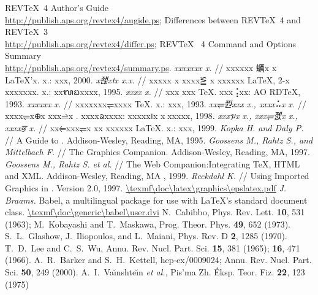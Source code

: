 \documentclass[
aps,%
12pt,%
final,%
notitlepage,%
oneside,%
onecolumn,%
nobibnotes,%
nofootinbib,%
superscriptaddress,%
noshowpacs,%
centertags]%
{revtex4}
\begin{document}
%
%
\begin{thebibliography}{99}
REV\TeX~4 Author's Guide\\
\url{http://publish.aps.org/revtex4/augide.ps};
Differences between REV\TeX~4 and REV\TeX~3\\
\url{http://publish.aps.org/revtex4/differ.ps};
REV\TeX~ 4 Command and Options Summary\\
\url{http://publish.aps.org/revtex4/summary.ps}.
{\it xxxxxxx x.} // xxxxxx 蠣x x \LaTeX'x. x.: xxx, 2000.
{\it x좮x᪨x x.x.} // xxxxx x xxxx⪠ x xxxxxx \LaTeX, 2-x xxxxxxx. x.: xxᬮᨭxxxx, 1995.
{\it xxxx x.} // xxx xxx \TeX. xxx⢨xx: AO RDTeX, 1993.
{\it xxxxxx x.} // xxxxxxx⥫xxxx TeX. x.: xxx, 1993.
{\it xx⥫쭨xxx x., xxxx⠥x x.} //
xxxx⥫x᪠x xxx⥬x \LaTeXe. xxxxᨡxxxx: xxxxx᪨x x஭xxxxx, 1998.
{\it xxxᥭx x., xxx⥫졠x x., xxxxਭ x.} //
xx⥢xxx⥫x xx xxxxxx \LaTeX. x.: xxx, 1999.
{\it Kopka H. and Daly P.} // A Guide to \LaTeXe.
Addison-Wesley, Reading, MA, 1995.
{\it Goossens M., Rahtz S., and Mittelbach F.} //
The \LaTeXe Graphics Companion.
Addison-Wesley, Reading, MA, 1997.
{\it Goossens M., Rahtz S. et al.} //
The \LaTeXe Web Companion:Integrating \TeX, HTML and XML.
Addison-Wesley, Reading, MA , 1999.
{\it Reckdahl K.} //
Using Imported Graphics in \LaTeXe. Version 2.0, 1997.
\url{\texmf\doc\latex\graphics\epslatex.pdf}
{\it J. Braams.} Babel, a multilingual package for use with \LaTeX{}'s
standard document class. \url{\texmf\doc\generic\babel\user.dvi}
%
N.~Cabibbo, Phys. Rev. Lett. \textbf{10}, 531 (1963);
M.~Kobayashi and T.~Maskawa, Prog. Theor. Phys. \textbf{49}, 652 (1973).
S.~L.~Glashow, J.~Iliopoulos, and L.~Maiani, Phys. Rev. D \textbf{2}, 1285 (1970).
T.~D.~Lee and C.~S.~Wu, Annu. Rev. Nucl. Part. Sci. \textbf{15}, 381 (1965);
\textbf{16}, 471 (1966).
A.~R.~Barker and S.~H.~Kettell, hep-ex/0009024;
Annu. Rev. Nucl. Part. Sci. \textbf{50}, 249 (2000).
A.~I.~Va\u{\i}nshte\u{\i}n \emph{et al.}, Pis'ma Zh. \'{E}ksp. Teor. Fiz. \textbf{22}, 123 (1975)

\end{thebibliography}
\end{document}
